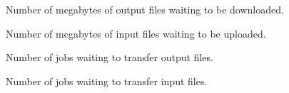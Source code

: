 \begin{description}
\item[\AdAttr{TransferQueueMBWaitingToDownload}]
  Number of megabytes of output files waiting to be downloaded.

\item[\AdAttr{TransferQueueMBWaitingToUpload}]
  Number of megabytes of input files waiting to be uploaded.

\item[\AdAttr{TransferQueueNumWaitingToDownload}]
  Number of jobs waiting to transfer output files.

\item[\AdAttr{TransferQueueNumWaitingToUpload}]
  Number of jobs waiting to transfer input files.

\end{description}


